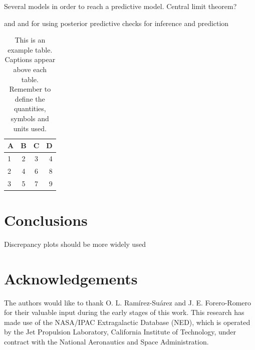 \documentclass[a4paper,fleqn,usenatbib]{mnras}
\begin{document}
Several models in order to reach a predictive model. Central limit theorem?

\citet{gelman2003} and \citet{ppcinf} and for using posterior predictive checks for inference and prediction





\begin{table}
	\centering
	\caption{This is an example table. Captions appear above each table.
	Remember to define the quantities, symbols and units used.}
	\label{tab:example_table}
	\begin{tabular}{lccr} %
		\hline
		A & B & C & D\\
		\hline
		1 & 2 & 3 & 4\\
		2 & 4 & 6 & 8\\
		3 & 5 & 7 & 9\\
		\hline
	\end{tabular}
\end{table}


\section{Conclusions}

Discrepancy plots should be more widely used 

\section*{Acknowledgements}

The authors would like to thank O. L. Ram\'irez-Su\'arez and J. E. Forero-Romero for their valuable input during the early stages of this work. This research has made use of the NASA/IPAC Extragalactic Database (NED), which is operated by the Jet Propulsion Laboratory, California Institute of Technology, under contract with the National Aeronautics and Space Administration.





\end{document}
